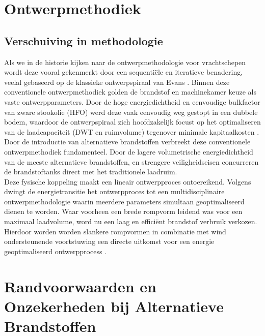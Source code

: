 \documentclass[a4paper]{IMDC2024}
\begin{document}
\section{Ontwerpmethodiek}

\subsection{Verschuiving in methodologie}
Als we in de historie kijken naar de ontwerpmethodologie voor vrachtschepen wordt deze vooral gekenmerkt door een sequentiële en iteratieve benadering, veelal gebaseerd op de klassieke ontwerpspiraal van Evans \citep{papanikolaou2026}. Binnen deze conventionele ontwerpmethodiek golden de brandstof en machinekamer keuze als vaste ontwerpparameters. Door de hoge energiedichtheid en eenvoudige bulkfactor van zware stookolie (HFO) werd deze vaak eenvoudig weg gestopt in een dubbele bodem, waardoor de ontwerpspiraal zich hoofdzakelijk focust op het optimaliseren van de laadcapaciteit (DWT en ruimvolume) tegenover minimale kapitaalkosten \citep{lindstad2022, mckenney2024}. Door de introductie van alternatieve brandstoffen verbreekt deze conventionele ontwerpmethodiek fundamenteel. Door de lagere volumetrische energiedichtheid van de meeste alternatieve brandstoffen, en strengere veiligheidseisen concurreren de brandstoftanks direct met het traditionele laadruim.
\\ 

Deze fysische koppeling maakt een lineair ontwerpproces ontoereikend. Volgens \citep{tadros2023} dwingt de energietransitie het ontwerpproces tot een multidisciplinaire ontwerpmethodologie waarin meerdere parameters simultaan geoptimaliseerd dienen te worden. Waar voorheen een brede rompvorm leidend was voor een maximaal laadvolume, word nu een laag en efficiënt brandstof verbruik verkozen. Hierdoor worden worden slankere rompvormen in combinatie met wind ondersteunende voortstuwing een directe uitkomst voor een energie geoptimaliseerd ontwerpprocess \citep{lindstad2022}. 


\section{Randvoorwaarden en Onzekerheden bij Alternatieve Brandstoffen}
\label{sec:randvoorwaarden_onzekerheden}
\end{document}
